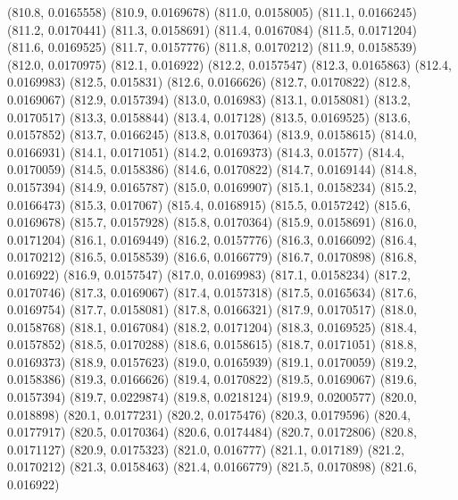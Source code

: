 {					(810.8, 0.0165558)
					(810.9, 0.0169678)
					(811.0, 0.0158005)
					(811.1, 0.0166245)
					(811.2, 0.0170441)
					(811.3, 0.0158691)
					(811.4, 0.0167084)
					(811.5, 0.0171204)
					(811.6, 0.0169525)
					(811.7, 0.0157776)
					(811.8, 0.0170212)
					(811.9, 0.0158539)
					(812.0, 0.0170975)
					(812.1, 0.016922)
					(812.2, 0.0157547)
					(812.3, 0.0165863)
					(812.4, 0.0169983)
					(812.5, 0.015831)
					(812.6, 0.0166626)
					(812.7, 0.0170822)
					(812.8, 0.0169067)
					(812.9, 0.0157394)
					(813.0, 0.016983)
					(813.1, 0.0158081)
					(813.2, 0.0170517)
					(813.3, 0.0158844)
					(813.4, 0.017128)
					(813.5, 0.0169525)
					(813.6, 0.0157852)
					(813.7, 0.0166245)
					(813.8, 0.0170364)
					(813.9, 0.0158615)
					(814.0, 0.0166931)
					(814.1, 0.0171051)
					(814.2, 0.0169373)
					(814.3, 0.01577)
					(814.4, 0.0170059)
					(814.5, 0.0158386)
					(814.6, 0.0170822)
					(814.7, 0.0169144)
					(814.8, 0.0157394)
					(814.9, 0.0165787)
					(815.0, 0.0169907)
					(815.1, 0.0158234)
					(815.2, 0.0166473)
					(815.3, 0.017067)
					(815.4, 0.0168915)
					(815.5, 0.0157242)
					(815.6, 0.0169678)
					(815.7, 0.0157928)
					(815.8, 0.0170364)
					(815.9, 0.0158691)
					(816.0, 0.0171204)
					(816.1, 0.0169449)
					(816.2, 0.0157776)
					(816.3, 0.0166092)
					(816.4, 0.0170212)
					(816.5, 0.0158539)
					(816.6, 0.0166779)
					(816.7, 0.0170898)
					(816.8, 0.016922)
					(816.9, 0.0157547)
					(817.0, 0.0169983)
					(817.1, 0.0158234)
					(817.2, 0.0170746)
					(817.3, 0.0169067)
					(817.4, 0.0157318)
					(817.5, 0.0165634)
					(817.6, 0.0169754)
					(817.7, 0.0158081)
					(817.8, 0.0166321)
					(817.9, 0.0170517)
					(818.0, 0.0158768)
					(818.1, 0.0167084)
					(818.2, 0.0171204)
					(818.3, 0.0169525)
					(818.4, 0.0157852)
					(818.5, 0.0170288)
					(818.6, 0.0158615)
					(818.7, 0.0171051)
					(818.8, 0.0169373)
					(818.9, 0.0157623)
					(819.0, 0.0165939)
					(819.1, 0.0170059)
					(819.2, 0.0158386)
					(819.3, 0.0166626)
					(819.4, 0.0170822)
					(819.5, 0.0169067)
					(819.6, 0.0157394)
					(819.7, 0.0229874)
					(819.8, 0.0218124)
					(819.9, 0.0200577)
					(820.0, 0.018898)
					(820.1, 0.0177231)
					(820.2, 0.0175476)
					(820.3, 0.0179596)
					(820.4, 0.0177917)
					(820.5, 0.0170364)
					(820.6, 0.0174484)
					(820.7, 0.0172806)
					(820.8, 0.0171127)
					(820.9, 0.0175323)
					(821.0, 0.016777)
					(821.1, 0.017189)
					(821.2, 0.0170212)
					(821.3, 0.0158463)
					(821.4, 0.0166779)
					(821.5, 0.0170898)
					(821.6, 0.016922)
}
